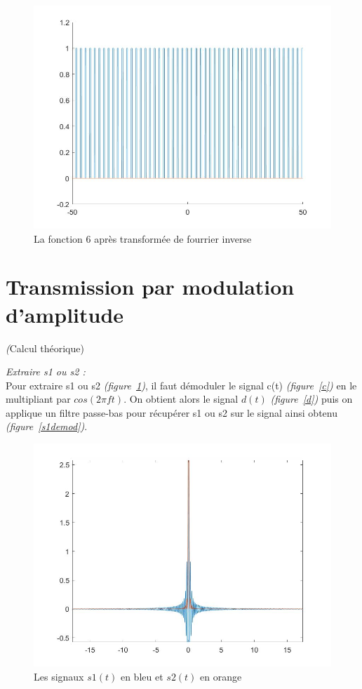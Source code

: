 \documentclass[10pt,a4paper]{article}
\begin{document}
\newpage
\begin{figure}[h] \begin{center}
\includegraphics[scale=0.35]{fct6.jpg}
\caption{La fonction 6 après transformée de fourrier inverse}
\end{center} \end{figure}



\section{Transmission par modulation d'amplitude}
\textit(Calcul théorique)

\textit{Extraire s1 ou s2 : }\\
Pour extraire s1 ou s2 \textit{(figure~\ref{s1s2})}, il faut démoduler le signal c(t) \textit{(figure~\ref{c})} en le multipliant par $cos(2 \pi f t)$. On obtient alors le signal $d(t)$ \textit{(figure~\ref{d})} puis on applique un filtre passe-bas pour récupérer s1 ou s2 sur le signal ainsi obtenu \textit{(figure~\ref{s1demod})}.

\begin{figure}[h]
\begin{center}
\includegraphics[scale=0.35]{tf_2signaux.jpg}
\caption{Les signaux $s1(t)$  en bleu et $s2(t)$ en orange}
\label{s1s2}
\end{center}
\end{figure}
\end{document}
